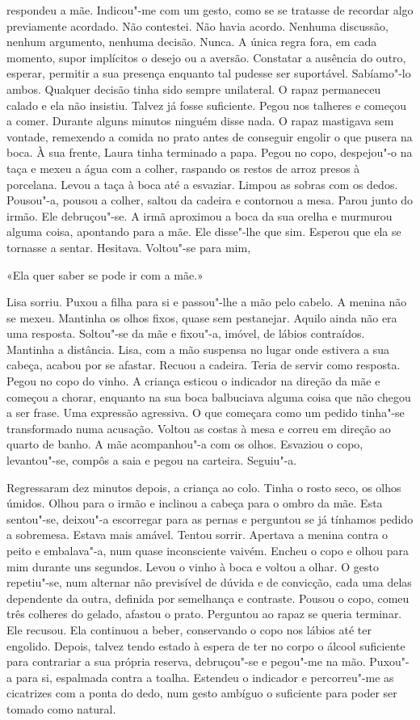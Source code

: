 respondeu a mãe. Indicou"-me com um gesto, como se se tratasse de
recordar algo previamente acordado. Não contestei. Não havia acordo.
Nenhuma discussão, nenhum argumento, nenhuma decisão. Nunca. A única
regra fora, em cada momento, supor implícitos o desejo ou a aversão.
Constatar a ausência do outro, esperar, permitir a sua presença enquanto
tal pudesse ser suportável. Sabíamo"-lo ambos. Qualquer decisão tinha
sido sempre unilateral. O rapaz permaneceu calado e ela não insistiu.
Talvez já fosse suficiente. Pegou nos talheres e começou a comer.
Durante alguns minutos ninguém disse nada. O rapaz mastigava sem
vontade, remexendo a comida no prato antes de conseguir engolir o que
pusera na boca. À sua frente, Laura tinha terminado a papa. Pegou no
copo, despejou"-o na taça e mexeu a água com a colher, raspando os
restos de arroz presos à porcelana. Levou a taça à boca até a esvaziar.
Limpou as sobras com os dedos. Pousou"-a, pousou a colher, saltou da
cadeira e contornou a mesa. Parou junto do irmão. Ele debruçou"-se. A
irmã aproximou a boca da sua orelha e murmurou alguma coisa, apontando
para a mãe. Ele disse"-lhe que sim. Esperou que ela se tornasse a
sentar. Hesitava. Voltou"-se para mim,

«Ela quer saber se pode ir com a mãe.»

Lisa sorriu. Puxou a filha para si e passou"-lhe a mão pelo cabelo. A
menina não se mexeu. Mantinha os olhos fixos, quase sem pestanejar.
Aquilo ainda não era uma resposta. Soltou"-se da mãe e fixou"-a, imóvel,
de lábios contraídos. Mantinha a distância. Lisa, com a mão suspensa no
lugar onde estivera a sua cabeça, acabou por se afastar. Recuou a
cadeira. Teria de servir como resposta. Pegou no copo do vinho. A
criança esticou o indicador na direção da mãe e começou a chorar,
enquanto na sua boca balbuciava alguma coisa que não chegou a ser frase.
Uma expressão agressiva. O que começara como um pedido tinha"-se
transformado numa acusação. Voltou as costas à mesa e correu em direção
ao quarto de banho. A mãe acompanhou"-a com os olhos. Esvaziou o copo,
levantou"-se, compôs a saia e pegou na carteira. Seguiu"-a.

Regressaram dez minutos depois, a criança ao colo. Tinha o rosto seco,
os olhos úmidos. Olhou para o irmão e inclinou a cabeça para o ombro da
mãe. Esta sentou"-se, deixou"-a escorregar para as pernas e perguntou se
já tínhamos pedido a sobremesa. Estava mais amável. Tentou sorrir.
Apertava a menina contra o peito e embalava"-a, num quase inconsciente
vaivém. Encheu o copo e olhou para mim durante uns segundos. Levou o
vinho à boca e voltou a olhar. O gesto repetiu"-se, num alternar não
previsível de dúvida e de convicção, cada uma delas dependente da outra,
definida por semelhança e contraste. Pousou o copo, comeu três colheres
do gelado, afastou o prato. Perguntou ao rapaz se queria terminar. Ele
recusou. Ela continuou a beber, conservando o copo nos lábios até ter
engolido. Depois, talvez tendo estado à espera de ter no corpo o álcool
suficiente para contrariar a sua própria reserva, debruçou"-se e
pegou"-me na mão. Puxou"-a para si, espalmada contra a toalha. Estendeu
o indicador e percorreu"-me as cicatrizes com a ponta do dedo, num gesto
ambíguo o suficiente para poder ser tomado como natural.

